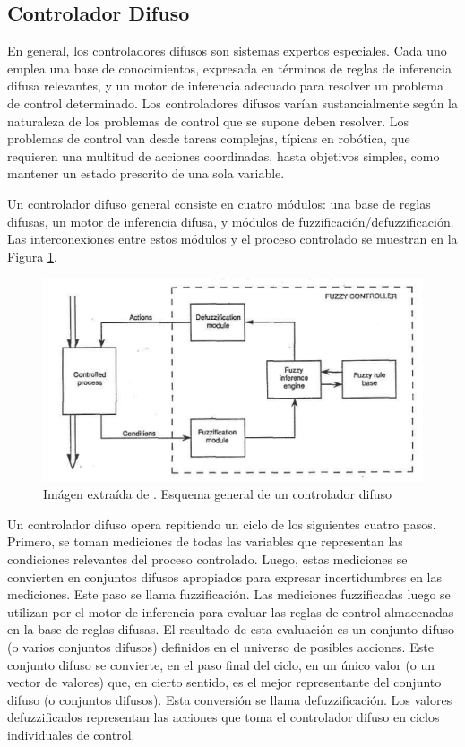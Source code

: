 \documentclass[10pt,twocolumn]{article}
\begin{document}
	\subsection{Controlador Difuso}
	
	En general, los controladores difusos son sistemas expertos especiales. Cada uno emplea una base de conocimientos, expresada en términos de reglas de inferencia difusa relevantes, y un motor de inferencia adecuado para resolver un problema de control determinado. Los controladores difusos varían sustancialmente según la naturaleza de los problemas de control que se supone deben resolver. Los problemas de control van desde tareas complejas, típicas en robótica, que requieren una multitud de acciones coordinadas, hasta objetivos simples, como mantener un estado prescrito de una sola variable.\cite{Fuzzy}
	
	Un controlador difuso general consiste en cuatro módulos: una base de reglas difusas, un motor de inferencia difusa, y módulos de fuzzificación/defuzzificación. Las interconexiones entre estos módulos y el proceso controlado se muestran en la Figura \ref{fig:diagram}.
	

		\begin{figure}
			\centering
			\includegraphics[width=1\linewidth]{diagram}
			\caption{Imágen extraída de \cite{fuzzy}. Esquema general de un controlador difuso}
			\label{fig:diagram}
		\end{figure}
	
	
	Un controlador difuso opera repitiendo un ciclo de los siguientes cuatro pasos. Primero, se toman mediciones de todas las variables que representan las condiciones relevantes del proceso controlado. Luego, estas mediciones se convierten en conjuntos difusos apropiados para expresar incertidumbres en las mediciones. Este paso se llama fuzzificación. Las mediciones fuzzificadas luego se utilizan por el motor de inferencia para evaluar las reglas de control almacenadas en la base de reglas difusas. El resultado de esta evaluación es un conjunto difuso (o varios conjuntos difusos) definidos en el universo de posibles acciones. Este conjunto difuso se convierte, en el paso final del ciclo, en un único valor (o un vector de valores) que, en cierto sentido, es el mejor representante del conjunto difuso (o conjuntos difusos). Esta conversión se llama defuzzificación. Los valores defuzzificados representan las acciones que toma el controlador difuso en ciclos individuales de control.\cite{Fuzzy}
	 
\end{document}
